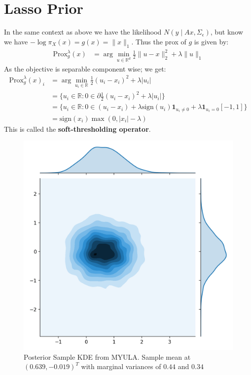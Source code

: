 \documentclass[a4paper,10pt]{article}
\newcommand{\RR}{\mathbb{R}}
\numberwithin{equation}{section}
\numberwithin{thm}{section}
\begin{document}
\newpage
\section{Lasso Prior}

In the same context as above we have the likelihood $N( y \mid A x, \Sigma_\epsilon)$, but know we have $- \log \pi_X (x) = g(x) = \| x \|_1$. Thus the prox of $g$ is given by:
\begin{align}
 \text{Prox}_g^\lambda (x) &= \arg \min_{u \in \RR^d} \tfrac{1}{2} \| u - x \|_2^2 + \lambda \|u \|_1
\end{align}
As the objective is separable component wise; we get:
\begin{align}
 \text{Prox}_g^\lambda (x)_i &= \arg \min_{u_i \in \RR} \tfrac{1}{2} ( u_i - x_i )^2 + \lambda |u_i| \\
 	&= \{ u_i \in \RR : 0 \in \partial  \tfrac{1}{2} ( u_i - x_i )^2 + \lambda |u_i| \} \\
 	&= \{ u_i \in \RR : 0 \in (u_i - x_i) + \lambda \text{sign}(u_i) \mathbf{1}_{u_i \neq 0} + \lambda \mathbf{1}_{u_i = 0} [-1,1] \} \\
 	&= \text{sign}(x_i) \max(0, |x_i| - \lambda)
\end{align}
This is called the \textbf{soft-thresholding operator}. 

\begin{figure}[h]
\label{fig:lasso_eg}
\centering
\includegraphics[scale=0.6]{figs/lasso_eg_samples.png}	
\caption{Posterior Sample KDE from MYULA. Sample mean at $(0.639, -0.019)^T$ with marginal variances of $0.44$ and $0.34$} 
\end{figure}
\end{document}
